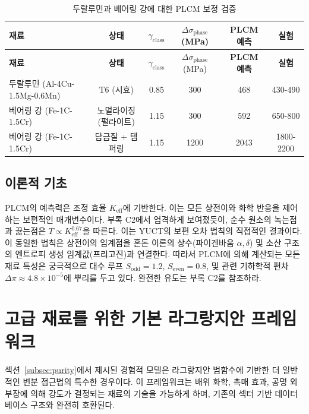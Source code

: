 \documentclass[12pt,a4paper]{article}
\begin{document}
	\begin{longtable}{lccccc}
		\caption{두랄루민과 베어링 강에 대한 PLCM 보정 검증} \label{tab:calibration-validation} \\
		\toprule
		\textbf{재료} & \textbf{상태} & \(\gamma_{\text{class}}\) & \(\Delta\sigma_{\text{phase}}\) (MPa) & \textbf{PLCM 예측} & \textbf{실험} \\
		\midrule
		\endfirsthead
		\toprule
		\textbf{재료} & \textbf{상태} & \(\gamma_{\text{class}}\) & \(\Delta\sigma_{\text{phase}}\) (MPa) & \textbf{PLCM 예측} & \textbf{실험} \\
		\midrule
		\endhead
		두랄루민 (Al-4Cu-1.5Mg-0.6Mn) & T6 (시효) & 0.85 & 300 & 468 & 430-490 \\
		베어링 강 (Fe-1C-1.5Cr) & 노멀라이징 (펄라이트) & 1.15 & 300 & 592 & 650-800 \\
		베어링 강 (Fe-1C-1.5Cr) & 담금질 + 템퍼링 & 1.15 & 1200 & 2043 & 1800-2200 \\
		\bottomrule
	\end{longtable}
	
	\subsection{이론적 기초}
	
	PLCM의 예측력은 조정 효율 $K_{\mathrm{eff}}$에 기반한다. 이는 모든 상전이와 화학 반응을 제어하는 보편적인 매개변수이다. 부록 C2에서 엄격하게 보여졌듯이, 순수 원소의 녹는점과 끓는점은 $T \propto K_{\mathrm{eff}}^{0.67}$을 따른다. 이는 YUCT의 보편 오차 법칙의 직접적인 결과이다. 이 동일한 법칙은 상전이의 임계점을 혼돈 이론의 상수(파이겐바움 $\alpha,\delta$) 및 소산 구조의 엔트로피 생성 임계값(프리고진)과 연결한다. 따라서 PLCM에 의해 계산되는 모든 재료 특성은 궁극적으로 대수 루프 $S_{\mathrm{odd}}=1.2$, $S_{\mathrm{even}}=0.8$, 및 관련 기하학적 편차 $\Delta\pi \approx 4.8\times10^{-5}$에 뿌리를 두고 있다. 완전한 유도는 부록 C2를 참조하라.
	
	\section{고급 재료를 위한 기본 라그랑지안 프레임워크}
	\label{sec:lagrangian}
	
	섹션~\ref{subsec:purity}에서 제시된 경험적 모델은 라그랑지안 범함수에 기반한 더 일반적인 변분 접근법의 특수한 경우이다. 이 프레임워크는 배위 화학, 촉매 효과, 공명 외부장에 의해 강도가 결정되는 재료의 기술을 가능하게 하며, 기존의 섹터 기반 데이터베이스 구조와 완전히 호환된다.
	
\end{document}
